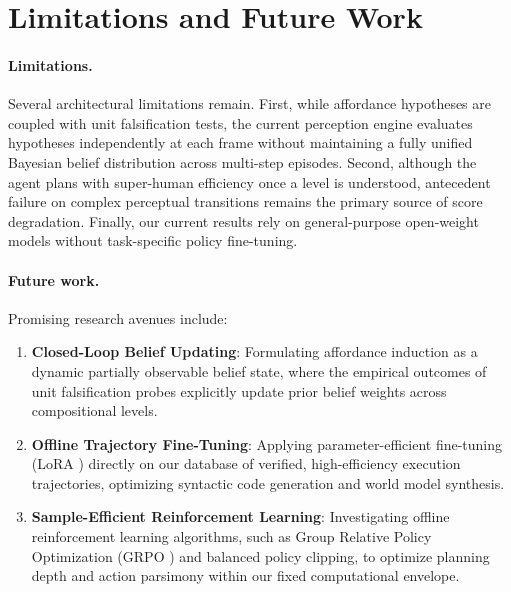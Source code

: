 \section{Limitations and Future Work}
\label{sec:future}

\paragraph{Limitations.}
Several architectural limitations remain. First, while affordance hypotheses are coupled with unit falsification tests, the current perception engine evaluates hypotheses independently at each frame without maintaining a fully unified Bayesian belief distribution across multi-step episodes. Second, although the agent plans with super-human efficiency once a level is understood, antecedent failure on complex perceptual transitions remains the primary source of score degradation. Finally, our current results rely on general-purpose open-weight models without task-specific policy fine-tuning.

\paragraph{Future work.}
Promising research avenues include:
\begin{enumerate}
    \item \textbf{Closed-Loop Belief Updating}: Formulating affordance induction as a dynamic partially observable belief state, where the empirical outcomes of unit falsification probes explicitly update prior belief weights across compositional levels.
    \item \textbf{Offline Trajectory Fine-Tuning}: Applying parameter-efficient fine-tuning (LoRA \citep{hu2021lora}) directly on our database of verified, high-efficiency execution trajectories, optimizing syntactic code generation and world model synthesis.
    \item \textbf{Sample-Efficient Reinforcement Learning}: Investigating offline reinforcement learning algorithms, such as Group Relative Policy Optimization (GRPO \citep{shao2024grpo}) and balanced policy clipping, to optimize planning depth and action parsimony within our fixed computational envelope.
\end{enumerate}

